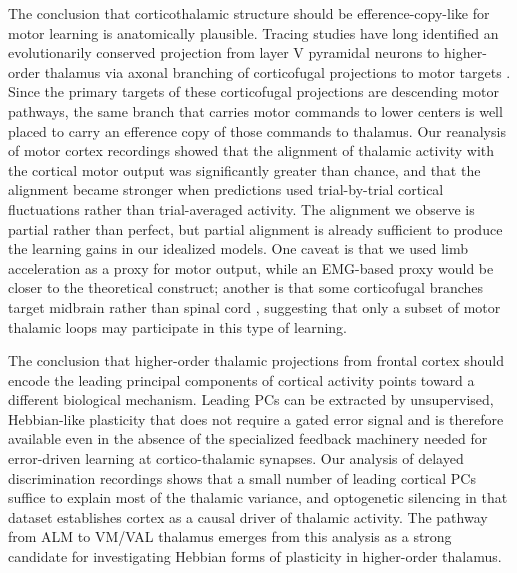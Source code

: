 \documentclass[11pt]{article}
\begin{document}
The conclusion that corticothalamic structure should be efference-copy-like
for motor learning is anatomically plausible. Tracing studies have long
identified an evolutionarily conserved projection from layer V
pyramidal neurons to higher-order thalamus via axonal branching of
corticofugal projections to motor targets \cite{yamawaki2015synaptic,
economo2018distinct}. Since the primary targets of these corticofugal
projections are descending motor pathways, the same branch that carries
motor commands to lower centers is well placed to carry an efference
copy of those commands to thalamus. Our reanalysis of motor cortex
recordings \cite{sauerbrei2020cortical} showed that the alignment of
thalamic activity with the cortical motor output was significantly
greater than chance, and that the alignment became stronger when
predictions used trial-by-trial cortical fluctuations rather than
trial-averaged activity. The alignment we observe is partial rather
than perfect, but partial alignment is already sufficient to produce
the learning gains in our idealized models. One caveat is that we used
limb acceleration as a proxy for motor output, while an EMG-based
proxy would be closer to the theoretical construct; another is that
some corticofugal branches target midbrain rather than spinal cord
\cite{economo2018distinct}, suggesting that only a subset of motor
thalamic loops may participate in this type of learning.

The conclusion that higher-order thalamic projections from frontal
cortex should encode the leading principal components of cortical
activity points toward a different biological mechanism. Leading PCs
can be extracted by unsupervised, Hebbian-like plasticity that does
not require a gated error signal and is therefore available even in
the absence of the specialized feedback machinery needed for
error-driven learning at cortico-thalamic synapses. Our analysis of
delayed discrimination recordings \cite{guo2017maintenance} shows that
a small number of leading cortical PCs suffice to explain most of the
thalamic variance, and optogenetic silencing in that dataset
establishes cortex as a causal driver of thalamic activity. The
pathway from ALM to VM/VAL thalamus
\cite{guo2018anterolateral, collins2018reciprocal} emerges from this
analysis as a strong candidate for investigating Hebbian forms of
plasticity in higher-order thalamus.
\end{document}
